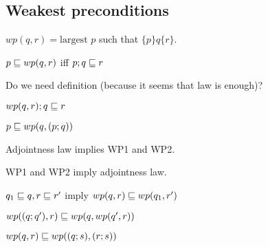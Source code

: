 \documentclass{article}
\begin{document}
\subsection*{Weakest preconditions}

\begin{definition}
$wp(q, r) = \textrm{largest } p$ such that $\{p\}q\{r\}$.
\end{definition}

\begin{law}[adjointness]
$p\sqsubseteq wp(q, r)$ iff $p;q \sqsubseteq r$
\end{law}

Do we need  definition (because it seems that law is enough)?

\begin{rul}[WP1]
$wp(q, r); q \sqsubseteq r$
\end{rul}

\begin{rul}[WP2]
$p \sqsubseteq wp(q, (p;q))$
\end{rul}

\begin{theorem}
Adjointness law implies WP1 and WP2.
\end{theorem}

\begin{theorem}
WP1 and WP2 imply adjointness law.
\end{theorem}



\begin{theorem}[wp monotonicity]
$q_1 \sqsubseteq q, r \sqsubseteq r'$ imply $wp(q, r) \sqsubseteq wp(q_1, r')$
\end{theorem}

\begin{theorem}[stepwise wp]
$wp((q;q'), r) \sqsubseteq wp(q, wp(q', r))$
\end{theorem}

\begin{theorem}
$wp(q, r) \sqsubseteq wp((q;s), (r;s))$
\end{theorem}
\end{document}
